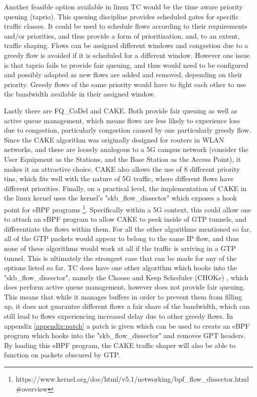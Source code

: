 Another feasible option available in linux TC would be the time aware priority queuing (taprio). This queuing discipline provides scheduled gates for specific traffic classes. It could be used to schedule flows according to their requirements and/or priorities, and thus provide a form of prioritization, and, to an extent, traffic shaping. Flows can be assigned different windows and congestion due to a greedy flow is avoided if it is scheduled for a different window. However one issue is that taprio fails to provide fair queuing, and thus would need to be configured and possibly adapted as new flows are added and removed, depending on their priority. Greedy flows of the same priority would have to fight each other to use the bandwidth available in their assigned window.

Lastly there are FQ\_CoDel and CAKE. Both provide fair queuing as well as active queue management, which means flows are less likely to experience loss due to congestion, particularly congestion caused by one particularly greedy flow. Since the CAKE algorithm was originally designed for routers in WLAN networks, and these are loosely analogous to a 5G campus network (consider the User Equipment as the Stations, and the Base Station as the Access Point), it makes it an attractive choice. CAKE also allows the use of 8 different priority tins, which fits well with the nature of 5G traffic, where different flows have different priorities. Finally, on a practical level, the implementation of CAKE in the linux kernel uses the kernel's "skb\_flow\_dissector" which exposes a hook point for eBPF programs \footnote{https://www.kernel.org/doc/html/v5.1/networking/bpf\_flow\_dissector.html\#overview}. Specifically within a 5G context, this could allow one to attach an eBPF program to allow CAKE to peek inside of GTP tunnels, and differentiate the flows within them. For all the other algorithms mentioned so far, all of the GTP packets would appear to belong to the same IP flow, and thus none of these algorithms would work at all if the traffic is arriving in a GTP tunnel. This is ultimately the strongest case that can be made for any of the options listed so far. TC does have one other algorithm which hooks into the "skb\_flow\_dissector", namely the Choose and Keep Scheduler (CHOKe) \cite{pan2000choke}, which does perform active queue management, however does not provide fair queuing. This means that while it manages buffers in order to prevent them from filling up, it does not guarantee different flows a fair share of the bandwidth, which can still lead to flows experiencing increased delay due to other greedy flows. In appendix \ref{appendix:patch} a patch is given which can be used to create an eBPF program which hooks into the "skb\_flow\_dissector" and removes GPT headers. By loading this eBPF program, the CAKE traffic shaper will also be able to function on packets obscured by GTP.


